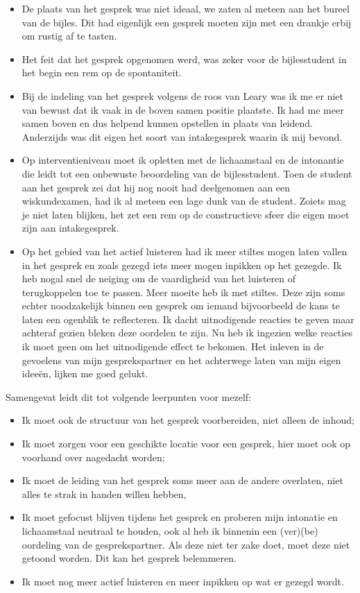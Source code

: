 \documentclass[a4paper,12pt]{article}
\theoremstyle{definition}
\begin{document}
\begin{itemize}
\begin{itemize}
  \end{itemize}  
  \item De plaats van het gesprek was niet ideaal, we zaten al meteen aan het 
  bureel van de bijles. Dit had eigenlijk een gesprek moeten zijn met een 
  drankje erbij om rustig af te tasten.
  \item Het feit dat het gesprek opgenomen werd, was zeker voor de bijlesstudent 
  in het begin een rem op de spontaniteit.
  \item Bij de indeling van het gesprek volgens de roos van Leary was ik me er niet van bewust dat ik vaak in 
de boven samen positie plaatste. Ik had me meer samen boven en dus helpend kunnen opstellen in 
plaats van leidend. Anderzijds was dit eigen het soort van intakegesprek waarin ik mij bevond.
\item Op interventieniveau moet ik opletten met de lichaamstaal en de intonantie die leidt tot een onbewuste 
beoordeling van de bijlesstudent. Toen de student aan het gesprek zei dat hij 
nog nooit had deelgenomen aan een wiskundexamen, had ik al meteen een lage dunk van de 
student. Zoiets mag je niet laten blijken, het zet een rem op de constructieve 
sfeer die eigen moet zijn aan intakegesprek.
\item Op het gebied van het actief luisteren had ik meer stiltes mogen laten vallen in het gesprek en zoals gezegd iets meer mogen inpikken op het gezegde. Ik heb 
nogal snel de neiging om de vaardigheid van het luisteren of terugkoppelen toe te passen. Meer moeite 
heb ik met stiltes. Deze zijn soms echter noodzakelijk binnen een gesprek om iemand bijvoorbeeld de 
kans te laten een ogenblik te reflecteren. Ik dacht uitnodigende reacties te geven maar achteraf gezien 
bleken deze oordelen te zijn. Nu heb ik ingezien welke reacties ik moet geen om het uitnodigende 
effect te bekomen. Het inleven in de gevoelens van mijn gesprekspartner en het achterwege laten van 
mijn eigen ideeën, lijken me goed gelukt. 

\end{itemize}
Samengevat leidt dit tot volgende leerpunten voor mezelf:
\begin{itemize}
  \item Ik moet ook de structuur van het gesprek voorbereiden, niet alleen de 
  inhoud;
  \item Ik moet zorgen voor een geschikte locatie voor een gesprek, hier 
  moet ook op voorhand over nagedacht worden;
  \item Ik moet de leiding van het gesprek soms meer aan de andere overlaten, 
  niet alles te strak in handen willen hebben,
  \item Ik moet gefocust blijven tijdens het gesprek en proberen mijn intonatie en lichaamstaal neutraal te houden, ook al heb ik binnenin een (ver)(be) oordeling van de gesprekspartner. 
  Als deze niet ter zake doet, moet deze niet getoond worden. Dit kan het 
  gesprek belemmeren.
\item Ik moet nog meer actief luisteren en meer inpikken op wat er gezegd wordt.
\end{itemize}
 
\end{document}
